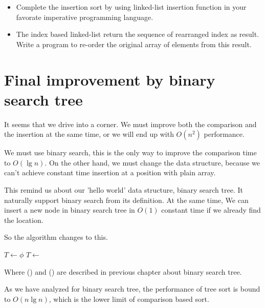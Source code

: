 \documentclass[b5paper]{article}
\begin{document}
\begin{Exercise}
\begin{itemize}
\item Complete the insertion sort by using linked-list insertion function
in your favorate imperative programming language.
\item The index based linked-list return the sequence of rearranged index
as result. Write a program to re-order the original array of elements from
this result.
\end{itemize}
\end{Exercise}


\section{Final improvement by binary search tree}

It seems that we drive into a corner. We must improve both the comparison
and the insertion at the same time, or we will end up with $O(n^2)$ performance.

We must use binary search, this is the only way to improve the comparison
time to $O(\lg n)$. On the other hand, we must change the data structure,
because we can't achieve constant time insertion at a position with
plain array.

This remind us about our 'hello world' data structure, binary search tree.
It naturally support binary search from its definition. At the same time,
We can insert a new node in binary search tree in $O(1)$ constant time
if we already find the location.

So the algorithm changes to this.

\begin{algorithmic}
  \State $T \gets \phi$
    \State $T \gets $ 
  \EndFor
  \State \Return {}
\EndFunction
\end{algorithmic}

Where () and () are described in
previous chapter about binary search tree.

As we have analyzed for binary search tree, the performance of tree sort
is bound to $O(n \lg n)$, which is the lower limit of comparison based
sort\cite{Knuth}.
\end{document}
